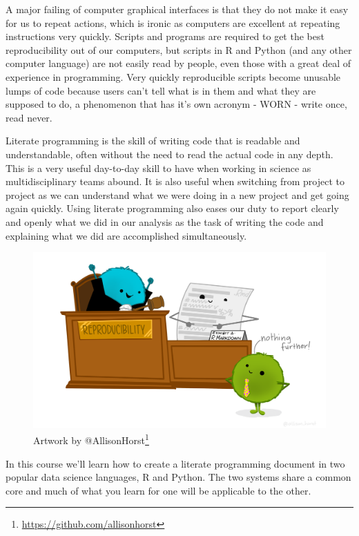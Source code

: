\documentclass[
]{book}
\renewcommand{\href}[2]{#2\footnote{\url{#1}}}
\begin{document}
A major failing of computer graphical interfaces is that they do not make it easy for us to repeat actions, which is ironic as computers are excellent at repeating instructions very quickly. Scripts and programs are required to get the best reproducibility out of our computers, but scripts in R and Python (and any other computer language) are not easily read by people, even those with a great deal of experience in programming. Very quickly reproducible scripts become unusable lumps of code because users can't tell what is in them and what they are supposed to do, a phenomenon that has it's own acronym - WORN - write once, read never.

Literate programming is the skill of writing code that is readable and understandable, often without the need to read the actual code in any depth. This is a very useful day-to-day skill to have when working in science as multidisciplinary teams abound. It is also useful when switching from project to project as we can understand what we were doing in a new project and get going again quickly. Using literate programming also eases our duty to report clearly and openly what we did in our analysis as the task of writing the code and explaining what we did are accomplished simultaneously.

\begin{figure}
\centering
\includegraphics{fig/reproducibility_court.png}
\caption{\label{fig:unnamed-chunk-2}Artwork by \href{https://github.com/allisonhorst}{@AllisonHorst}}
\end{figure}

In this course we'll learn how to create a literate programming document in two popular data science languages, R and Python. The two systems share a common core and much of what you learn for one will be applicable to the other.
\end{document}
